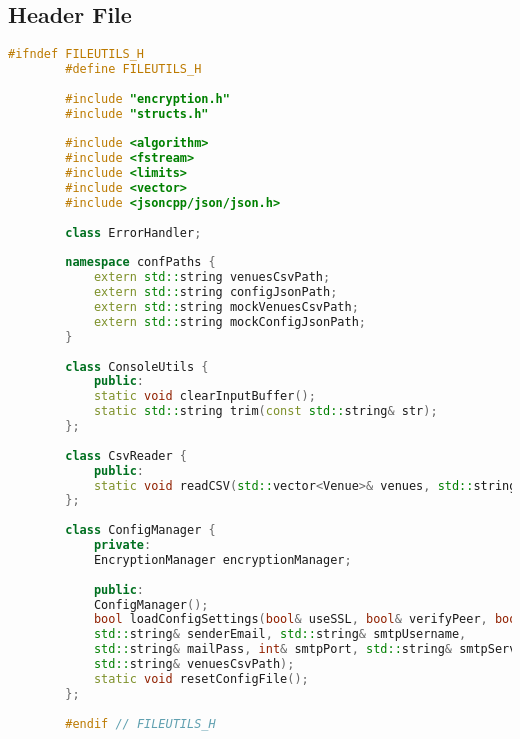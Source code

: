 \documentclass{article}
\begin{document}
	\subsection*{Header File}
	\begin{mdframed}[backgroundcolor=background, hidealllines=false, innerleftmargin=15pt, innerrightmargin=5pt, innertopmargin=0pt, innerbottommargin=-5pt]
	\begin{lstlisting}[language=C++]
		#ifndef FILEUTILS_H
		#define FILEUTILS_H
		
		#include "encryption.h"
		#include "structs.h"
		
		#include <algorithm>
		#include <fstream> 
		#include <limits>
		#include <vector>
		#include <jsoncpp/json/json.h>
		
		class ErrorHandler;
		
		namespace confPaths {
			extern std::string venuesCsvPath;
			extern std::string configJsonPath;
			extern std::string mockVenuesCsvPath;
			extern std::string mockConfigJsonPath;
		}
		
		class ConsoleUtils {
			public:
			static void clearInputBuffer();
			static std::string trim(const std::string& str);
		};
		
		class CsvReader {
			public:
			static void readCSV(std::vector<Venue>& venues, std::string& venuesCsvPath);
		};
		
		class ConfigManager {
			private:
			EncryptionManager encryptionManager;
			
			public:
			ConfigManager();
			bool loadConfigSettings(bool& useSSL, bool& verifyPeer, bool& verifyHost, bool& verbose, 
			std::string& senderEmail, std::string& smtpUsername, 
			std::string& mailPass, int& smtpPort, std::string& smtpServer, 
			std::string& venuesCsvPath);
			static void resetConfigFile();
		};
		
		#endif // FILEUTILS_H
	\end{lstlisting}
\end{mdframed}
\end{document}

